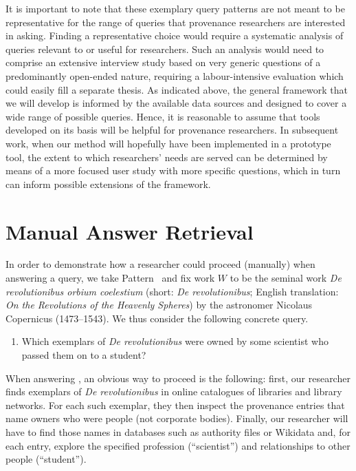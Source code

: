 %
It is important to note that these exemplary query patterns are not meant to be representative
for the range of queries that provenance researchers are interested in asking.
Finding a representative choice would require a systematic analysis
of queries relevant to or useful for researchers.
Such an analysis would need to comprise an extensive interview study
based on very generic questions of a predominantly open-ended nature,
requiring a labour-intensive evaluation which could easily fill a separate thesis.
As indicated above, the general framework that we will develop
is informed by the available data sources
and designed to cover a wide range of possible queries.
Hence,
it is reasonable to assume that tools developed on its basis will be helpful for provenance researchers.
In subsequent work, when our method will hopefully have been implemented in a prototype tool,
the extent to which researchers' needs are served can be determined by means of a more focused user study
with more specific questions, which in turn can inform possible extensions of the framework.

\section{Manual Answer Retrieval}
\label{sec:manual_answering}

In order to demonstrate how a researcher could proceed (manually) when answering a query,
we take Pattern~ and fix work $W$ to be the seminal work \emph{De revolutionibus orbium coelestium}
(short: \emph{De revolutionibus}; English translation: \emph{On the Revolutions of the Heavenly Spheres}) \autocite{Kopernikus1543}
by the astronomer Nicolaus Copernicus (1473–1543).
We thus consider the following concrete query.
%
\begin{enumerate}
  \item[\exaquery{2$'$}]
    Which exemplars of \emph{De revolutionibus} were owned by some scientist who passed them on to a student?
\end{enumerate}
%
When answering , an obvious way to proceed is the following:
first, our researcher finds exemplars of \emph{De revolutionibus} 
in online catalogues of libraries and library networks. For each such exemplar, they then inspect the provenance entries
that name owners who were people (not corporate bodies). Finally, our researcher will have to find those names in databases such as
authority files or Wikidata and, for each entry, explore the specified profession (\enquote{scientist})
and relationships to other people (\enquote{student}).

